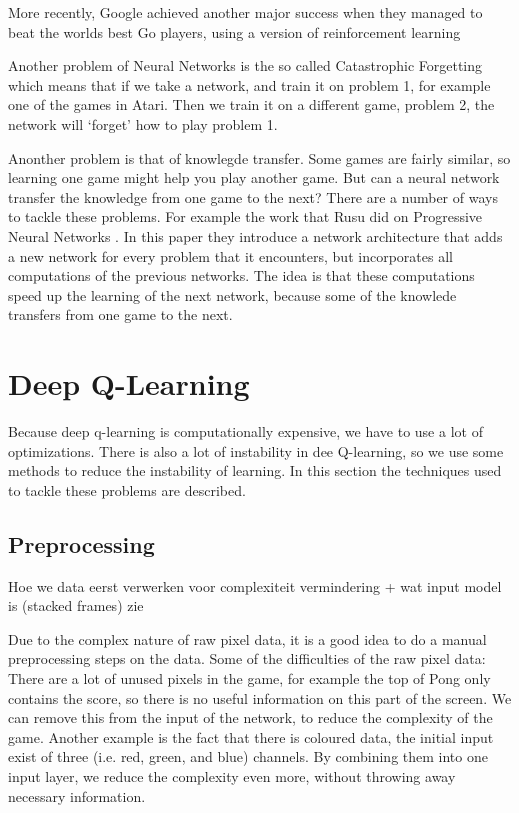 \documentclass{article}
\begin{document}
More recently, Google achieved another major success when they managed to beat the worlds best Go players, using a version of reinforcement learning

Another problem of Neural Networks is the so called Catastrophic Forgetting which means that if we take a network, and train it on problem 1, for example one of the games in Atari. Then we train it on a different game, problem 2, the network will `forget' how to play problem 1. 

Anonther problem is that of knowlegde transfer. Some games are fairly similar, so learning one game might help you play another game. But can a neural network transfer the knowledge from one game to the next? There are a number of ways to tackle these problems. For example the work that Rusu did on Progressive Neural Networks \cite{rusu2016progressive}. In this paper they introduce a network architecture that adds a new network for every problem that it encounters, but incorporates all computations of the previous networks. The idea is that these computations speed up the learning of the next network, because some of the knowlede transfers from one game to the next. 

\section{Deep Q-Learning}

Because deep q-learning is computationally expensive, we have to use a lot of optimizations. There is also a lot of instability in dee Q-learning, so we use some methods to reduce the instability of learning. In this section the techniques used to tackle these problems are described.

\subsection{Preprocessing}
Hoe we data eerst verwerken voor complexiteit vermindering + wat input model is (stacked frames) zie \cite{mnih2013playing}

Due to the complex nature of raw pixel data, it is a good idea to do a manual preprocessing steps on the data. Some of the difficulties of the raw pixel data: There are a lot of unused pixels in the game, for example the top of Pong only contains the score, so there is no useful information on this part of the screen. We can remove this from the input of the network, to reduce the complexity of the game. Another example is the fact that there is coloured data, the initial input exist of three (i.e. red, green, and blue) channels. By combining them into one input layer, we reduce the complexity even more, without throwing away necessary information.
\end{document}

